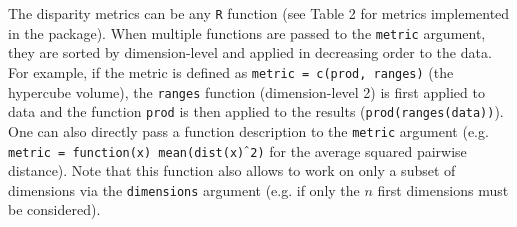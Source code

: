 \documentclass[12pt,letterpaper]{article}
\begin{document}
The disparity metrics can be any \texttt{R} function (see Table 2 for metrics implemented in the package).
When multiple functions are passed to the \texttt{metric} argument, they are sorted by dimension-level and applied in decreasing order to the data.
For example, if the metric is defined as \texttt{metric = c(prod, ranges)} (the hypercube volume), the \texttt{ranges} function (dimension-level 2) is first applied to data and the function \texttt{prod} is then applied to the results (\texttt{prod(ranges(data))}).
One can also directly pass a function description to the \texttt{metric} argument (e.g. \texttt{metric = function(x) mean(dist(x)$\hat{\mkern6mu}$2)} for the average squared pairwise distance).
Note that this function also allows to work on only a subset of dimensions via the \texttt{dimensions} argument (e.g. if only the $n$ first dimensions must be considered).
\end{document}
